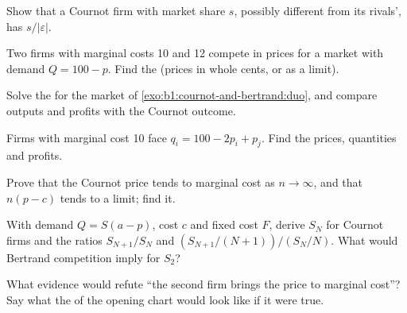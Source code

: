 \begin{exercise}[$\star\star$]\label{exo:b1:cournot-and-bertrand:share}
Show that a Cournot firm with market share $s$, possibly different from its
rivals', has  $s/|\varepsilon|$.
\end{exercise}

\begin{exercise}[$\star\star$]\label{exo:b1:cournot-and-bertrand:unequal}
Two firms with marginal costs 10 and 12 compete in prices for a market with
demand $Q = 100 - p$. Find the  (prices in whole cents, or as a limit).
\end{exercise}

\begin{exercise}[$\star\star$]\label{exo:b1:cournot-and-bertrand:stack}
Solve the  for the market of
\cref{exo:b1:cournot-and-bertrand:duo}, and compare outputs and profits
with the Cournot outcome.
\end{exercise}

\begin{exercise}[$\star\star$]\label{exo:b1:cournot-and-bertrand:diff}
Firms with marginal cost 10 face $q_i = 100 - 2p_i + p_j$. Find the  prices, quantities and profits.
\end{exercise}

\begin{exercise}[$\star\star\star$]\label{exo:b1:cournot-and-bertrand:limit-ex}
Prove that the Cournot price tends to marginal cost as $n \to \infty$, and that
$n(p - c)$ tends to a limit; find it.
\end{exercise}

\begin{exercise}[$\star\star\star$]\label{exo:b1:cournot-and-bertrand:thresholds}
With demand $Q = S(a - p)$, cost $c$ and fixed cost $F$, derive $S_N$ for Cournot
firms and the ratios $S_{N+1}/S_N$ and $(S_{N+1}/(N + 1))/(S_N/N)$. What would
Bertrand competition imply for $S_2$?
\end{exercise}

\begin{exercise}[$\star\star\star$]\label{exo:b1:cournot-and-bertrand:refute}
What evidence would refute ``the second firm brings the price to marginal
cost''? Say what the  of the opening chart would look like
if it were true.
\end{exercise}

